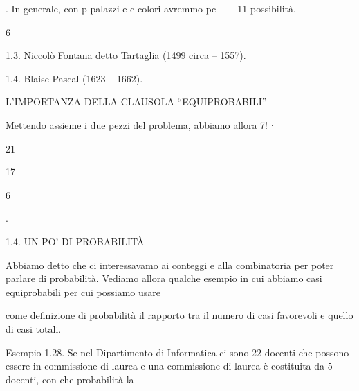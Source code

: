 \documentclass[a4paper,portrait,12pt]{article}
\begin{document}
\begin{flushleft}
. In generale, con p palazzi e c colori avremmo pc $-$$-$ 11 possibilit\`{a}.
\end{flushleft}


6


\begin{flushleft}
1.3. Niccol\`{o} Fontana detto Tartaglia (1499 circa -- 1557).
\end{flushleft}


\begin{flushleft}
1.4. Blaise Pascal (1623 -- 1662).
\end{flushleft}





\begin{flushleft}
 L'IMPORTANZA DELLA CLAUSOLA {``}EQUIPROBABILI''
\end{flushleft}





\begin{flushleft}
Mettendo assieme i due pezzi del problema, abbiamo allora 7! ⋅
\end{flushleft}





21





17


6





.





\begin{flushleft}
1.4. UN PO' DI PROBABILIT\`{A}
\end{flushleft}


\begin{flushleft}
Abbiamo detto che ci interessavamo ai conteggi e alla combinatoria per poter parlare di probabilit\`{a}. Vediamo allora qualche esempio in cui abbiamo casi equiprobabili per cui possiamo usare
\end{flushleft}


\begin{flushleft}
come definizione di probabilit\`{a} il rapporto tra il numero di casi favorevoli e quello di casi totali.
\end{flushleft}


\begin{flushleft}
Esempio 1.28. Se nel Dipartimento di Informatica ci sono 22 docenti che possono essere in commissione di laurea e una commissione di laurea \`{e} costituita da 5 docenti, con che probabilit\`{a} la
\end{flushleft}
\end{document}
